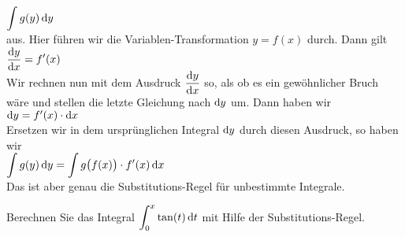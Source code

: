 \\[0.2cm]
\hspace*{1.3cm}
$\displaystyle\int g(y)\, \textrm{d} y$
\\[0.2cm]
aus.  Hier f\"uhren wir die Variablen-Transformation $y = f(x)$ durch. Dann gilt 
\\[0.2cm]
\hspace*{1.3cm}
$\displaystyle \frac{\textrm{d} y}{\textrm{d} x} = f'(x)$
\\[0.2cm]
Wir rechnen nun mit dem Ausdruck $\displaystyle\frac{\textrm{d} y}{\textrm{d} x}$ so, als ob es ein gew\"ohnlicher Bruch w\"are und stellen die
letzte Gleichung nach $\textrm{d} y$ um.  Dann haben wir 
\\[0.2cm]
\hspace*{1.3cm}
$\textrm{d} y = f'(x)\cdot \textrm{d} x$
\\[0.2cm]
Ersetzen wir in dem urspr\"unglichen Integral $\textrm{d} y$ durch diesen Ausdruck, so haben wir 
\\[0.2cm]
\hspace*{1.3cm}
$\displaystyle\int g(y)\, \textrm{d} y = \int g\bigl(f(x)\bigr)\cdot f'(x)\, \textrm{d} x$
\\[0.2cm]
Das ist aber genau die Substitutions-Regel f\"ur unbestimmte Integrale.

\exercise
Berechnen Sie das Integral $\displaystyle \int_0^x \tan(t)\, \textrm{d} t$ mit Hilfe der Substitutions-Regel.  \eox

